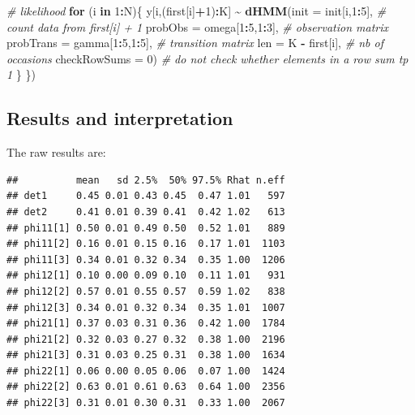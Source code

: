 \documentclass[
  12pt,
]{krantz}
\newenvironment{Shaded}{\begin{snugshade}}{\end{snugshade}}
\newcommand{\AttributeTok}[1]{\textcolor[rgb]{0.13,0.29,0.53}{#1}}
\newcommand{\CommentTok}[1]{\textcolor[rgb]{0.56,0.35,0.01}{\textit{#1}}}
\newcommand{\ControlFlowTok}[1]{\textcolor[rgb]{0.13,0.29,0.53}{\textbf{#1}}}
\newcommand{\DecValTok}[1]{\textcolor[rgb]{0.00,0.00,0.81}{#1}}
\newcommand{\FunctionTok}[1]{\textcolor[rgb]{0.13,0.29,0.53}{\textbf{#1}}}
\newcommand{\NormalTok}[1]{#1}
\newcommand{\SpecialCharTok}[1]{\textcolor[rgb]{0.81,0.36,0.00}{\textbf{#1}}}
\begin{document}
\begin{Shaded}
\begin{Highlighting}[]
  \CommentTok{\# likelihood }
  \ControlFlowTok{for}\NormalTok{ (i }\ControlFlowTok{in} \DecValTok{1}\SpecialCharTok{:}\NormalTok{N)\{}
\NormalTok{    y[i,(first[i]}\SpecialCharTok{+}\DecValTok{1}\NormalTok{)}\SpecialCharTok{:}\NormalTok{K] }\SpecialCharTok{\textasciitilde{}} \FunctionTok{dHMM}\NormalTok{(}\AttributeTok{init =}\NormalTok{ init[i,}\DecValTok{1}\SpecialCharTok{:}\DecValTok{5}\NormalTok{],           }\CommentTok{\# count data from first[i] + 1}
                               \AttributeTok{probObs =}\NormalTok{ omega[}\DecValTok{1}\SpecialCharTok{:}\DecValTok{5}\NormalTok{,}\DecValTok{1}\SpecialCharTok{:}\DecValTok{3}\NormalTok{],     }\CommentTok{\# observation matrix}
                               \AttributeTok{probTrans =}\NormalTok{ gamma[}\DecValTok{1}\SpecialCharTok{:}\DecValTok{5}\NormalTok{,}\DecValTok{1}\SpecialCharTok{:}\DecValTok{5}\NormalTok{],   }\CommentTok{\# transition matrix}
                               \AttributeTok{len =}\NormalTok{ K }\SpecialCharTok{{-}}\NormalTok{ first[i],           }\CommentTok{\# nb of occasions}
                               \AttributeTok{checkRowSums =} \DecValTok{0}\NormalTok{)             }\CommentTok{\# do not check whether elements in a row sum tp 1}
\NormalTok{  \}}
\NormalTok{\})}
\end{Highlighting}
\end{Shaded}

\subsection{Results and interpretation}\label{results-and-interpretation-4}

The raw results are:

\begin{verbatim}
##          mean   sd 2.5%  50% 97.5% Rhat n.eff
## det1     0.45 0.01 0.43 0.45  0.47 1.01   597
## det2     0.41 0.01 0.39 0.41  0.42 1.02   613
## phi11[1] 0.50 0.01 0.49 0.50  0.52 1.01   889
## phi11[2] 0.16 0.01 0.15 0.16  0.17 1.01  1103
## phi11[3] 0.34 0.01 0.32 0.34  0.35 1.00  1206
## phi12[1] 0.10 0.00 0.09 0.10  0.11 1.01   931
## phi12[2] 0.57 0.01 0.55 0.57  0.59 1.02   838
## phi12[3] 0.34 0.01 0.32 0.34  0.35 1.01  1007
## phi21[1] 0.37 0.03 0.31 0.36  0.42 1.00  1784
## phi21[2] 0.32 0.03 0.27 0.32  0.38 1.00  2196
## phi21[3] 0.31 0.03 0.25 0.31  0.38 1.00  1634
## phi22[1] 0.06 0.00 0.05 0.06  0.07 1.00  1424
## phi22[2] 0.63 0.01 0.61 0.63  0.64 1.00  2356
## phi22[3] 0.31 0.01 0.30 0.31  0.33 1.00  2067
\end{verbatim}
\end{document}
